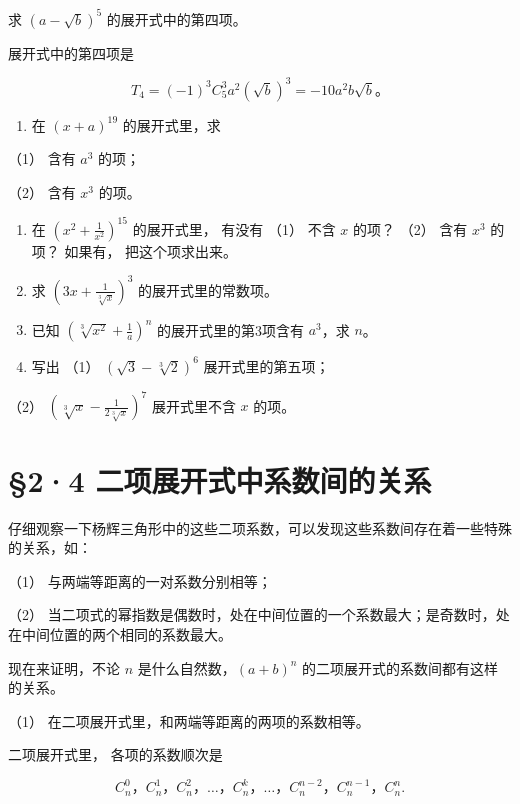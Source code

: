 求 \((a - \sqrt{b})^5\) 的展开式中的第四项。


展开式中的第四项是

\[
T_4=(-1)^3C_5^3a^{2}(\sqrt b)^3=-10a^2b\sqrt b\text{。}
\]

\begin{enumerate}
\item
  在 \((x + a)^{19}\) 的展开式里，求
\end{enumerate}

（1） 含有 \(a^3\) 的项；

（2） 含有 \(x^3\) 的项。

\begin{enumerate}[start=2]
\item
  在 \(\left(x^{2} + \frac{1}{x^{2}}\right)^{15}\) 的展开式里， 有没有
  （1） 不含 \(x\) 的项？ （2） 含有 \(x^{3}\) 的项？ 如果有，
  把这个项求出来。
\item
  求 \(\left(3x + \frac{1}{\sqrt[3]{x}}\right)^3\) 的展开式里的常数项。
\item
  已知 \(\left(\sqrt[3]{x^2} + \frac{1}{a}\right)^n\)
  的展开式里的第3项含有 \(a^3\)，求 \(n\)。
\item
  写出 （1） \((\sqrt{3} - \sqrt[3]{2})^6\) 展开式里的第五项；
\end{enumerate}

（2） \(\left(\sqrt[3]{x} - \frac{1}{2\sqrt[3]{x}}\right)^7\)
展开式里不含 \(x\) 的项。

\section{§2·4 二项展开式中系数间的关系}

仔细观察一下杨辉三角形中的这些二项系数，可以发现这些系数间存在着一些特殊的关系，如：

（1） 与两端等距离的一对系数分别相等；

（2）
当二项式的幂指数是偶数时，处在中间位置的一个系数最大；是奇数时，处在中间位置的两个相同的系数最大。

现在来证明，不论 \(n\) 是什么自然数，\((a + b)^n\)
的二项展开式的系数间都有这样的关系。

（1） 在二项展开式里，和两端等距离的两项的系数相等。

 二项展开式里， 各项的系数顺次是

\[
C _ {n} ^ {0}\text{，} C _ {n} ^ {1}\text{，} C _ {n} ^ {2}\text{，} \dots \text{，} C _ {n} ^ {k}\text{，} \dots \text{，} C _ {n} ^ {n - 2}\text{，} C _ {n} ^ {n - 1}\text{，} C _ {n} ^ {n}.
\]

